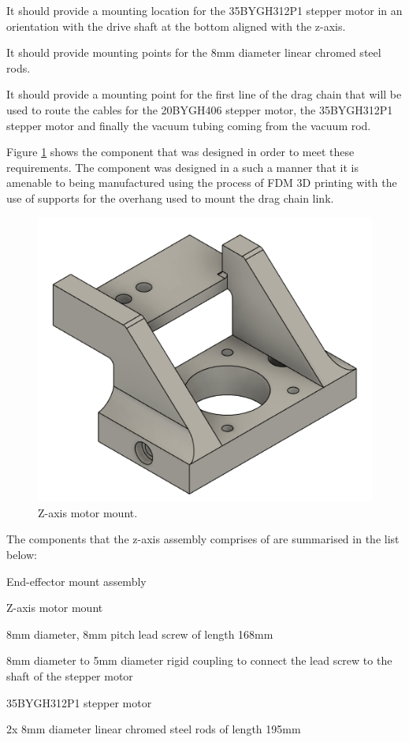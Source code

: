 \begin{compactitem}
	\item It should provide a mounting location for the 35BYGH312P1 stepper motor in an orientation with the drive shaft at the bottom aligned with the z-axis.
	\item It should provide mounting points for the 8mm diameter linear chromed steel rods.
	\item It should provide a mounting point for the first line of the drag chain that will be used to route the cables for the 20BYGH406 stepper motor, the 35BYGH312P1 stepper motor and finally the vacuum tubing coming from the vacuum rod.
\end{compactitem}

Figure \ref{fig:z-axis-motor-mount} shows the component that was designed in order to meet these requirements. The component was designed in a such a manner that it is amenable to being manufactured using the process of FDM 3D printing with the use of supports for the overhang used to mount the drag chain link.

\begin{figure}[H]
	\centering
	\includegraphics[width=0.4\linewidth]{figures/z-axis-motor-mount.png}
	\caption{Z-axis motor mount.}
	\label{fig:z-axis-motor-mount}
\end{figure}

The components that the z-axis assembly comprises of are summarised in the list below:

\begin{compactitem}
	\item End-effector mount assembly
	\item Z-axis motor mount
	\item 8mm diameter, 8mm pitch lead screw of length 168mm
	\item 8mm diameter to 5mm diameter rigid coupling to connect the lead screw to the shaft of the stepper motor
	\item 35BYGH312P1 stepper motor
	\item 2x 8mm diameter linear chromed steel rods of length 195mm
\end{compactitem}

